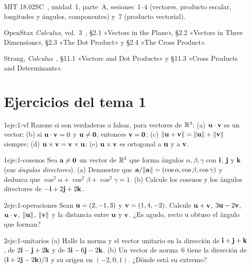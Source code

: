 \begin{lecturas}
\item MIT 18.02SC~\cite{mit1802}, unidad~1, parte~A, sesiones~1--4 (vectores, producto escalar, longitudes y ángulos, componentes) y~7 (producto vectorial).
\item OpenStax \emph{Calculus}, vol.~3~\cite{openstax3}, §2.1 «Vectors in the Plane», §2.2 «Vectors in Three Dimensions», §2.3 «The Dot Product» y §2.4 «The Cross Product».
\item Strang, \emph{Calculus}~\cite{strangcalc}, §11.1 «Vectors and Dot Products» y §11.3 «Cross Products and Determinants».
\end{lecturas}

\section*{Ejercicios del tema 1}

\begin{ejercicio}{1}{eje:1-vf}
Razone si son verdaderas o falsas, para vectores de $\mathbb{R}^3$: (a) $\mathbf{u}\cdot\mathbf{v}$ es un vector; (b) si $\mathbf{u}\cdot\mathbf{v}=0$ y $\mathbf{u}\neq\mathbf{0}$, entonces $\mathbf{v}=\mathbf{0}$; (c) $\lVert\mathbf{u}+\mathbf{v}\rVert=\lVert\mathbf{u}\rVert+\lVert\mathbf{v}\rVert$ siempre; (d) $\mathbf{u}\times\mathbf{v}=\mathbf{v}\times\mathbf{u}$; (e) $\mathbf{u}\times\mathbf{v}$ es ortogonal a $\mathbf{u}$ y a $\mathbf{v}$.
\end{ejercicio}

\begin{ejercicio}{1}{eje:1-cosenos}
Sea $\mathbf{a}\neq\mathbf{0}$ un vector de $\mathbb{R}^3$ que forma ángulos $\alpha,\beta,\gamma$ con $\mathbf{i}$, $\mathbf{j}$ y $\mathbf{k}$ (sus \emph{ángulos directores}). (a) Demuestre que $\mathbf{a}/\lVert\mathbf{a}\rVert=(\cos\alpha,\cos\beta,\cos\gamma)$ y deduzca que $\cos^2\alpha+\cos^2\beta+\cos^2\gamma=1$. (b) Calcule los cosenos y los ángulos directores de $-\mathbf{i}+2\mathbf{j}+2\mathbf{k}$.
\end{ejercicio}

\begin{ejercicio}{2}{eje:1-operaciones}
Sean $\mathbf{u}=(2,-1,3)$ y $\mathbf{v}=(1,4,-2)$. Calcule $\mathbf{u}+\mathbf{v}$, $3\mathbf{u}-2\mathbf{v}$, $\mathbf{u}\cdot\mathbf{v}$, $\lVert\mathbf{u}\rVert$, $\lVert\mathbf{v}\rVert$ y la distancia entre $\mathbf{u}$ y $\mathbf{v}$. ¿Es agudo, recto u obtuso el ángulo que forman?
\end{ejercicio}

\begin{ejercicio}{2}{eje:1-unitarios}
(a) Halle la norma y el vector unitario en la dirección de $\mathbf{i}+\mathbf{j}+\mathbf{k}$, de $2\mathbf{i}-\mathbf{j}+2\mathbf{k}$ y de $3\mathbf{i}-6\mathbf{j}-2\mathbf{k}$. (b) Un vector de norma~6 tiene la dirección de $(\mathbf{i}+2\mathbf{j}-2\mathbf{k})/3$ y su origen en $(-2,0,1)$. ¿Dónde está su extremo?
\end{ejercicio}

